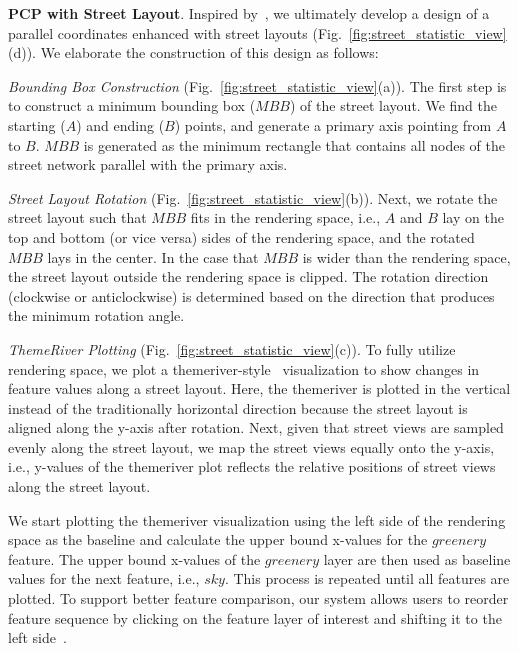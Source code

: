 \vspace*{2mm}
\noindent
\textbf{PCP with Street Layout}. Inspired by~\cite{qu_2007_visual}, we ultimately develop a design of a parallel coordinates enhanced with street layouts (Fig.~\ref{fig:street_statistic_view}(d)).
We elaborate the construction of this design as follows:

\vspace*{1mm}
\noindent
\textit{Bounding Box Construction} (Fig.~\ref{fig:street_statistic_view}(a)).
The first step is to construct a minimum bounding box ($MBB$) of the street layout.
We find the starting ($A$) and ending ($B$) points, and generate a primary axis pointing from $A$ to $B$.
$MBB$ is generated as the minimum rectangle that contains all nodes of the street network parallel with the primary axis.

\vspace*{1mm}
\noindent
\textit{Street Layout Rotation} (Fig.~\ref{fig:street_statistic_view}(b)).
Next, we rotate the street layout such that $MBB$ fits in the rendering space, i.e., $A$ and $B$ lay on the top and bottom (or vice versa) sides of the rendering space, and the rotated $MBB$ lays in the center.
In the case that $MBB$ is wider than the rendering space, the street layout outside the rendering space is clipped.
The rotation direction (clockwise or anticlockwise) is determined based on the direction that produces the minimum rotation angle.

\vspace*{1mm}
\noindent
\textit{ThemeRiver Plotting} (Fig.~\ref{fig:street_statistic_view}(c)).
To fully utilize rendering space, we plot a themeriver-style~\cite{havre_2002_themeriver} visualization to show changes in feature values along a street layout.
Here, the themeriver is plotted in the vertical instead of the traditionally horizontal direction because the street layout is aligned along the y-axis after rotation.
Next, given that street views are sampled evenly along the street layout, we map the street views equally onto the y-axis, i.e., y-values of the themeriver plot reflects the relative positions of street views along the street layout.

We start plotting the themeriver visualization using the left side of the rendering space as the baseline and calculate the upper bound x-values for the $greenery$ feature.
The upper bound x-values of the $greenery$ layer are then used as baseline values for the next feature, i.e., $sky$.
This process is repeated until all features are plotted.
To support better feature comparison, our system allows users to reorder feature sequence by clicking on the feature layer of interest and shifting it to the left side~\cite{byron_2008_stacked}.

